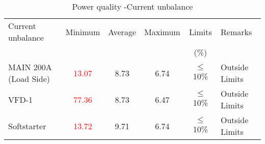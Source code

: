 \begin{table}[!htb]
	\caption{Power quality -Current unbalance}
	\label{tbl_ch04_elecaudit_powerquality_currentunbalance}
	{\scriptsize	
	\begin{tabular}{l|c|c|c|c|l}
		\hline
		Current unbalance & Minimum & Average & Maximum & Limits & Remarks \\ 
		&  &  &  & (\%) &  \\ 
		\hline
		MAIN 200A (Load Side) & \textcolor{red}{13.07} &  8.73  & 6.74 & $\leq$ 10\% & Outside  Limits \\ 
		VFD-1 & \textcolor{red}{77.36} &  8.73  & 6.47 & $\leq$ 10\% & Outside  Limits \\ 
		Softstarter & \textcolor{red}{13.72} &  9.71  & 6.74 & $\leq$ 10\% & Outside  Limits \\ 
		\hline
	\end{tabular}
		
	}%
\end{table}